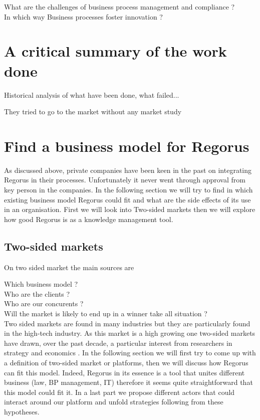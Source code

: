 \documentclass[10pt]{report}
\begin{document}
What are the challenges of business process management and compliance ?\\
In which way Business processes foster innovation ?

\section{A critical summary of the work done}
Historical analysis of what have been done, what failed...

They tried to go to the market without any market study

\section{Find a business model for Regorus}

As discussed above, private companies have been keen in the past on integrating Regorus in their processes. Unfortunately it never went through approval from key person in the companies. In the following section we will try to find in which existing business model Regorus could fit and what are the side effects of its use in an organisation. First we will look into Two-sided markets then we will explore how good Regorus is as a knowledge management tool.

\subsection{Two-sided markets}
On two sided market the main sources are \autocite{ParkerA05} \autocite{eisenmann2006strategies} \autocite{rochet2003platform} \autocite{Hagiu2011} \autocite{economides2006}

Which business model ?\\
Who are the clients ?\\
Who are our concurents ?\\

Will the market is likely to end up in a winner take all situation ?\\

Two sided markets are found in many industries but they are particularly found in the high-tech industry. As this market is a high growing one two-sided markets have drawn, over the past decade, a particular interest from researchers in strategy and economics \autocite{Hagiu2011}. In the following section we will first try to come up with a definition of two-sided market or platforms, then we will discuss how Regorus can fit this model. Indeed, Regorus in its essence is a tool that unites different business (law, BP management, IT) therefore it seems quite straightforward that this model could fit it. In a last part we propose different actors that could interact around our platform and unfold strategies following from these hypotheses.
\end{document}
